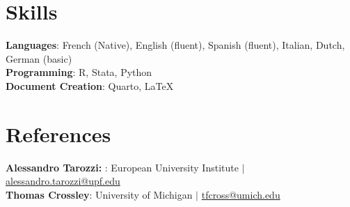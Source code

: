 \documentclass[11pt]{article}
\begin{document}
\section{Skills}
 \begin{itemize}[leftmargin=0.5cm, label={}]
    \small{\item{
     \textbf{Languages}{: French (Native), English (fluent), Spanish (fluent), Italian, Dutch, German (basic)} \\
     \textbf{Programming}{: R, Stata, Python} \\
     \textbf{Document Creation}{: Quarto, LaTeX} 
    }}
 \end{itemize}
    

\section{References}
 \begin{itemize}[leftmargin=0.5cm, label={}]
    \small{\item{
     \textbf{Alessandro Tarozzi: }{: European University Institute  $|$ \href{mailto:alessandro.tarozzi@upf.edu}{alessandro.tarozzi@upf.edu}} \\
     \textbf{Thomas Crossley}{:  University of Michigan $|$ \href{mailto:tfcross@umich.edu}{tfcross@umich.edu}} 
    }}
 \end{itemize} 
    
  
\end{document}

